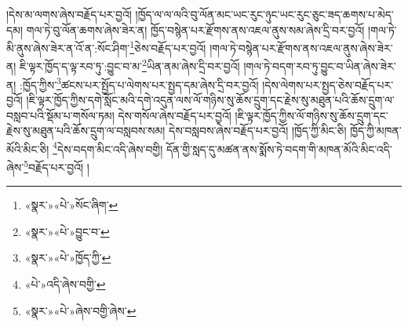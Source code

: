།དེས་མ་ལགས་ཞེས་བརྗོད་པར་བྱའོ། །ཁྱོད་ལ་ལ་ལའི་བུ་ལོན་མང་ཡང་རུང་ཉུང་ཡང་རུང་ཅུང་ཟད་ཆགས་པ་མེད་དམ། གལ་ཏེ་བུ་ལོན་ཆགས་ཞེས་ཟེར་ན། ཁྱོད་བསྙེན་པར་རྫོགས་ནས་འཇལ་ནུས་སམ་ཞེས་དྲི་བར་བྱའོ། །གལ་ཏེ་མི་ནུས་ཞེས་ཟེར་ན་འོ་ན་:སོང་ཤིག་\footnote{«སྣར་»«པེ་»སོང་ཞིག་}ཅེས་བརྗོད་པར་བྱའོ། །གལ་ཏེ་བསྙེན་པར་རྫོགས་ནས་འཇལ་ནུས་ཞེས་ཟེར་ན། ཇི་ལྟར་ཁྱོད་ད་ལྟ་རབ་ཏུ་:བྱུང་བ་མ་\footnote{«སྣར་»«པེ་»བྱུང་བ་}ཡིན་ནམ་ཞེས་དྲི་བར་བྱའོ། །གལ་ཏེ་བདག་རབ་ཏུ་བྱུང་བ་ཡིན་ཞེས་ཟེར་ན། :ཁྱོད་ཀྱིས་\footnote{«སྣར་»«པེ་»ཁྱོད་ཀྱི་}ཚངས་པར་སྤྱོད་པ་ལེགས་པར་སྤྱད་དམ་ཞེས་དྲི་བར་བྱའོ། །དེས་ལེགས་པར་སྤྱད་ཅེས་བརྗོད་པར་བྱའོ། །ཇི་ལྟར་ཁྱོད་ཀྱིས་དགེ་སློང་མའི་དགེ་འདུན་ལས་ལོ་གཉིས་སུ་ཆོས་དྲུག་དང་རྗེས་སུ་མཐུན་པའི་ཆོས་དྲུག་ལ་བསླབ་པའི་སྡོམ་པ་གསོལ་ཏམ། དེས་གསོལ་ཞེས་བརྗོད་པར་བྱའོ། །ཇི་ལྟར་ཁྱོད་ཀྱིས་ལོ་གཉིས་སུ་ཆོས་དྲུག་དང་རྗེས་སུ་མཐུན་པའི་ཆོས་དྲུག་ལ་བསླབས་སམ། དེས་བསླབས་ཞེས་བརྗོད་པར་བྱའོ། །ཁྱོད་ཀྱི་མིང་ཅི། ཁྱོད་ཀྱི་མཁན་མོའི་མིང་ཅི། \footnote{«པེ་»འདི་ཞེས་བགྱི་}དེས་བདག་མིང་འདི་ཞེས་བགྱི། དོན་གྱི་སླད་དུ་མཚན་ནས་སྨོས་ཏེ་བདག་གི་མཁན་མོའི་མིང་འདི་ཞེས་\footnote{«སྣར་»«པེ་»ཞེས་བགྱི་ཞེས་}བརྗོད་པར་བྱའོ། །
